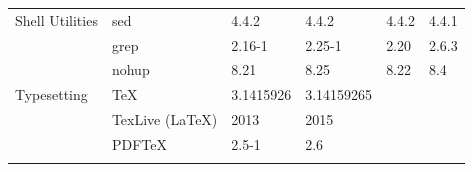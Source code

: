 \begin{table}[!ht]
{\begin{tabular}{ll|l|l|l|l|}
\cellcolor{white} Shell Utilities                                      & \multicolumn{1}{|l|}{sed}                    & 4.4.2                                                               & 4.4.2                                                             & 4.4.2                                                                  & 4.4.1                                                       \\ \cline{2-6}
\cellcolor{white}                                                      & \multicolumn{1}{|l|}{grep}                   & 2.16-1                                                              & 2.25-1                                                            & 2.20                                                                   & 2.6.3                                                       \\ \cline{2-6} \rowcolor{gray!25}
\cellcolor{white}                                                      & \multicolumn{1}{|l|}{nohup}                  & 8.21                                                                & 8.25                                                              & 8.22                                                                   & 8.4                                                         \\ \hline
\cellcolor{white} Typesetting                                          & \multicolumn{1}{|l|}{\TeX}                   & 3.1415926                                                           & 3.14159265                                                        &                                                                        &                                                             \\ \cline{2-6} \rowcolor{gray!25}
\cellcolor{white}                                                      & \multicolumn{1}{|l|}{TexLive (\LaTeX)}       & 2013                                                                & 2015                                                              &                                                                        &                                                             \\ \cline{2-6}
\cellcolor{white}                                                      & \multicolumn{1}{|l|}{PDF\TeX}                & 2.5-1                                                               & 2.6                                                               &                                                                        &                                                             \\ \cline{2-6} \rowcolor{gray!25}

\end{tabular}}
\end{table}
